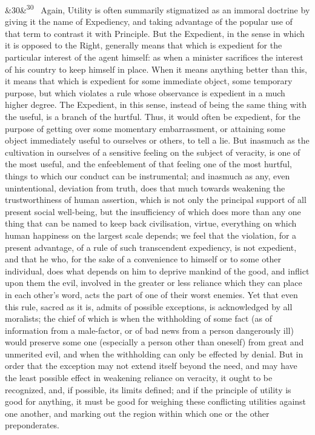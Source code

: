 \documentclass[12pt]{article}
\newcommand{\para}[1][]{\par\noindent\ifx&#1&\else\textsuperscript{\footnotesize #1}~\fi}
\begin{document}
\para[30] Again, Utility is often summarily stigmatized as an immoral doctrine by giving it the name of Expediency, and taking advantage of the popular use of that term to contrast it with Principle. But the Expedient, in the sense in which it is opposed to the Right, generally means that which is expedient for the particular interest of the agent himself: as when a minister sacrifices the interest of his country to keep himself in place. When it means anything better than this, it means that which is expedient for some immediate object, some temporary purpose, but which violates a rule whose observance is expedient in a much higher degree. The Expedient, in this sense, instead of being the same thing with the useful, is a branch of the hurtful. Thus, it would often be expedient, for the purpose of getting over some momentary embarrassment, or attaining some object immediately useful to ourselves or others, to tell a lie. But inasmuch as the cultivation in ourselves of a sensitive feeling on the subject of veracity, is one of the most useful, and the enfeeblement of that feeling one of the most hurtful, things to which our conduct can be instrumental; and inasmuch as any, even unintentional, deviation from truth, does that much towards weakening the trustworthiness of human assertion, which is not only the principal support of all present social well-being, but the insufficiency of which does more than any one thing that can be named to keep back civilisation, virtue, everything on which human happiness on the largest scale depends; we feel that the violation, for a present advantage, of a rule of such transcendent expediency, is not expedient, and that he who, for the sake of a convenience to himself or to some other individual, does what depends on him to deprive mankind of the good, and inflict upon them the evil, involved in the greater or less reliance which they can place in each other's word, acts the part of one of their worst enemies. Yet that even this rule, sacred as it is, admits of possible exceptions, is acknowledged by all moralists; the chief of which is when the withholding of some fact (as of information from a male-factor, or of bad news from a person dangerously ill) would preserve some one (especially a person other than oneself) from great and unmerited evil, and when the withholding can only be effected by denial. But in order that the exception may not extend itself beyond the need, and may have the least possible effect in weakening reliance on veracity, it ought to be recognized, and, if possible, its limits defined; and if the principle of utility is good for anything, it must be good for weighing these conflicting utilities against one another, and marking out the region within which one or the other preponderates.
\end{document}
